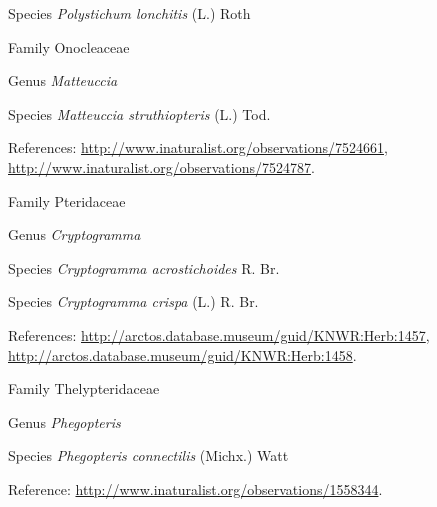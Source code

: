 \documentclass[9pt, article]{memoir}
\begin{document}
\begin{multicols}{2}
\vspace{6pt}\noindent\hspace{36pt}Species \textit{Polystichum lonchitis} (L.) Roth


\vspace{6pt}\noindent\hspace{24pt}Family Onocleaceae


\vspace{6pt}\noindent\hspace{30pt}Genus \textit{Matteuccia}


\vspace{6pt}\noindent\hspace{36pt}Species \textit{Matteuccia struthiopteris} (L.) Tod.


\vspace{6pt}References: 
\url{http://www.inaturalist.org/observations/7524661}, 
\url{http://www.inaturalist.org/observations/7524787}.

\vspace{6pt}\noindent\hspace{24pt}Family Pteridaceae


\vspace{6pt}\noindent\hspace{30pt}Genus \textit{Cryptogramma}


\vspace{6pt}\noindent\hspace{36pt}Species \textit{Cryptogramma acrostichoides} R. Br.


\vspace{6pt}\noindent\hspace{36pt}Species \textit{Cryptogramma crispa} (L.) R. Br.


\vspace{6pt}References: 
\url{http://arctos.database.museum/guid/KNWR:Herb:1457}, 
\url{http://arctos.database.museum/guid/KNWR:Herb:1458}.

\vspace{6pt}\noindent\hspace{24pt}Family Thelypteridaceae


\vspace{6pt}\noindent\hspace{30pt}Genus \textit{Phegopteris}


\vspace{6pt}\noindent\hspace{36pt}Species \textit{Phegopteris connectilis} (Michx.) Watt


\vspace{6pt}Reference: 
\url{http://www.inaturalist.org/observations/1558344}.


\end{multicols}
\end{document}
